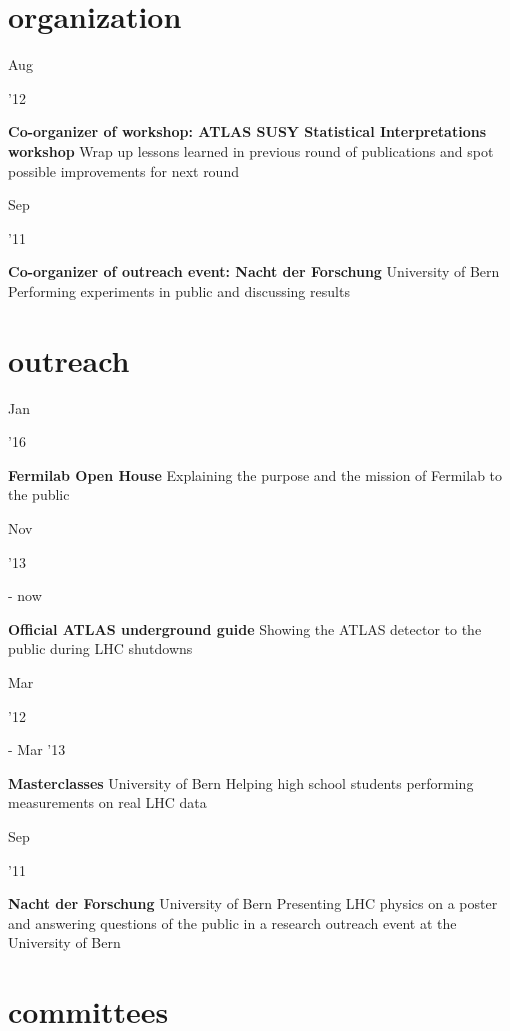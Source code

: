 \documentclass[]{cv} %
\begin{document}
\section{organization}

\begin{entrylist}

  \entry
  {\parbox[t]{\parboxWidthOne}{Aug}\parbox[t]{\parboxWidthTwo}{\hfill '12}}
  {\textbf{Co-organizer of workshop: ATLAS SUSY Statistical Interpretations workshop}}
  {}
  {Wrap up lessons learned in previous round of publications and spot possible
  improvements for next round}

  \entry
  {\parbox[t]{\parboxWidthOne}{Sep}\parbox[t]{\parboxWidthTwo}{\hfill '11}}
  {\textbf{Co-organizer of outreach event: Nacht der Forschung}}
  {University of Bern}
  {Performing experiments in public and discussing results}

\end{entrylist}

\section{outreach}

\begin{entrylist}

  \entry
  {\parbox[t]{\parboxWidthOne}{Jan}\parbox[t]{\parboxWidthTwo}{\hfill '16}}
  {\textbf{Fermilab Open House}}
  {}
  {Explaining the purpose and the mission of Fermilab to the public}

  \entry
  {\parbox[t]{\parboxWidthOne}{Nov}\parbox[t]{\parboxWidthTwo}{\hfill '13} - now}
  {\textbf{Official ATLAS underground guide}}
  {}
  {Showing the ATLAS detector to the public during LHC shutdowns}

  \entry
  {\parbox[t]{\parboxWidthOne}{Mar}\parbox[t]{\parboxWidthTwo}{\hfill '12} - Mar
'13}
  {\textbf{Masterclasses}}
  {University of Bern}
  {Helping high school students performing measurements on real LHC data}

  \entry
  {\parbox[t]{\parboxWidthOne}{Sep}\parbox[t]{\parboxWidthTwo}{\hfill '11}}
  {\textbf{Nacht der Forschung}}
  {University of Bern}
  {Presenting LHC physics on a poster and answering questions of the public in a
  research outreach event at the University of Bern}

\end{entrylist}

\section{committees}
\end{document}
